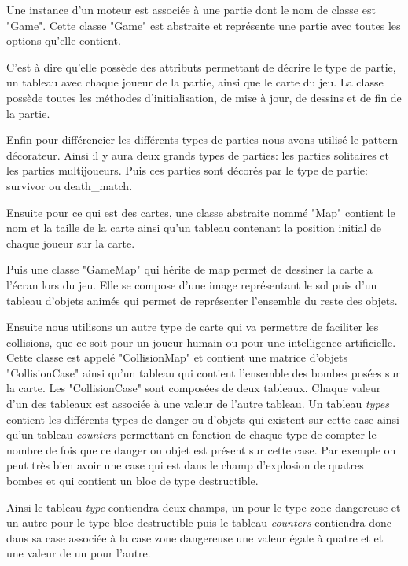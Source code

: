 		Une instance d'un moteur est associée à une partie dont le nom de classe est "Game".
		Cette classe "Game" est abstraite et représente une partie avec toutes les options qu'elle contient.
		
		C'est à dire qu'elle possède des attributs permettant de décrire le type de partie,
		un tableau avec chaque joueur de la partie, ainsi que le carte du jeu.
		La classe possède toutes les méthodes d'initialisation, de mise à jour,
		 de dessins et de fin de la partie.
		
		Enfin pour différencier les différents types de parties nous avons utilisé
		 le \gls{pattern} décorateur.
		 Ainsi il y aura deux grands types de parties: les parties solitaires 
		 et les parties multijoueurs.
		 Puis ces parties sont décorés par le type de partie: \gls{survivor} ou \gls{death_match}.
	
		Ensuite pour ce qui est des cartes, une classe abstraite nommé "Map" 
		contient le nom et la taille de la carte ainsi qu'un tableau contenant 
		la position initial de chaque joueur sur la carte.
		
		Puis une classe "GameMap" qui hérite de map permet de dessiner 
		la carte a l'écran lors du jeu.
		Elle se compose d'une image représentant le sol puis d'un tableau 
		d'objets animés qui permet de représenter l'ensemble du reste des objets.
		
		Ensuite nous utilisons un autre type de carte qui va permettre de 
		faciliter les collisions, que ce soit pour un joueur humain ou pour 
		une intelligence artificielle.
		Cette classe est appelé "CollisionMap" et contient une matrice d'objets
		"CollisionCase" ainsi qu'un tableau qui contient l'ensemble des bombes 
		posées sur la carte.
		Les "CollisionCase" sont composées de deux tableaux.
		Chaque valeur d'un des tableaux est associée à une valeur de l'autre tableau.
		Un tableau \textit{types} contient les différents types de danger ou d'objets 
		qui existent sur cette case ainsi qu'un tableau \textit{counters} permettant 
		en fonction de chaque type de compter le nombre de fois que ce danger ou objet 
		est présent sur cette case.
		Par exemple on peut très bien avoir une case qui est dans le champ d'explosion
		de quatres bombes et qui contient un bloc de type destructible.
		
		Ainsi le tableau \textit{type} contiendra deux champs, un pour le 
		type zone dangereuse et un autre pour le type bloc destructible puis 
		le tableau \textit{counters} contiendra donc dans sa case associée à 
		la case zone dangereuse une valeur égale à quatre et et une valeur de
		un pour l'autre.
		

